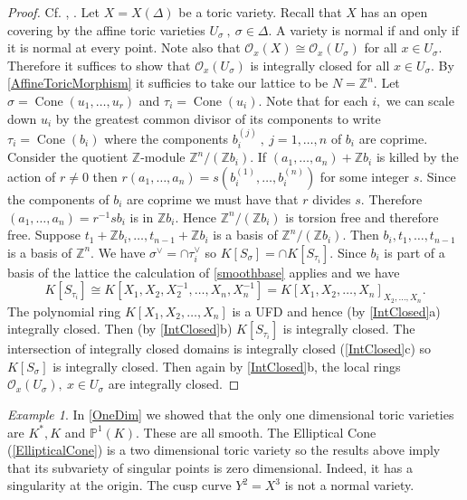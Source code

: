 \documentclass[BSc]{usydthesis}
\numberwithin{equation}{chapter}
\theoremstyle{remark}
\newtheorem{Example}[equation]{Example}
\newcommand{\Z}{\mathbb{Z}}
\newcommand{\Proj}{\mathbb{P}}
\newcommand{\V}{\vee}
\DeclareMathOperator{\Cone}{Cone}
\begin{document}
\begin{proof} Cf. \cite[Theorem 1.3.5]{Cox}, \cite[Page~ 29-30]{Fulton:Toric}. Let $X=X(\Delta)$ be a toric variety. Recall that $X$ has an open covering by the affine toric varieties $U_{\sigma} \ , \ \sigma \in \Delta.$ A variety is normal if and only if it is normal at every point. Note also that $\mathcal{O}_x(X) \cong \mathcal{O}_x(U_{\sigma})$ for all $x\in U_{\sigma}.$ Therefore it suffices to show that $\mathcal{O}_x(U_{\sigma})$ is integrally closed for all $x\in U_{\sigma}$. By \ref{AffineToricMorphism} it sufficies to take our lattice to be $N=\Z^n.$ Let $\sigma = \Cone(u_1, \ldots, u_r)$ and $\tau_i=\Cone(u_i).$ Note that for each $i,$ we can scale down $u_i$ by the greatest common divisor of its components to write $\tau_i = \Cone(b_i)$ where the components $b_i^{(j)} \ , \ j=1,\ldots, n$ of $b_i$ are coprime. Consider the quotient $\Z$-module $\Z^n/(\Z b_i).$ If $(a_1,\ldots, a_n)+\Z b_i$ is killed by the action of $r\neq 0$ then $r(a_1,\ldots, a_n) = s\left(b_i^{(1)}, \ldots, b_i^{(n)}\right)$ for some integer $s.$ Since the components of $b_i$ are coprime we must have that $r$ divides $s.$ Therefore $(a_1,\ldots, a_n) = r^{-1}s b_i$ is in $\Z b_i.$ Hence $\Z^n/(\Z b_i)$ is torsion free and therefore free. Suppose $t_1+ \Z b_i, \ldots, t_{n-1}+ \Z b_i$ is a basis of $\Z^n/(\Z b_i).$ Then $b_i, t_1, \ldots, t_{n-1}$ is a basis of $\Z^n.$ We have $\sigma^{\V} = \cap \tau_i^{\V}$ so $K[S_{\sigma}] = \cap K[S_{\tau_i}].$ Since $b_i$ is part of a basis of the lattice the calculation of \ref{smoothbase} applies and we have $$K[S_{\tau_i}] \cong K[X_1, X_2, X_2^{-1}, \ldots, X_n, X_n^{-1}]=K[X_1,X_2,\ldots,X_n]_{X_2,\ldots,X_n}.$$ The polynomial ring $K[X_1,X_2,\ldots, X_n]$ is a UFD and hence (by \ref{IntClosed}a) integrally closed. Then  (by \ref{IntClosed}b) $K[S_{\tau_i}]$ is integrally closed. The intersection of integrally closed domains is integrally closed (\ref{IntClosed}c) so $K[S_{\sigma}]$ is integrally closed. Then again by \ref{IntClosed}b, the local rings $\mathcal{O}_x(U_{\sigma}), \ x\in U_{\sigma}$ are integrally closed.
\end{proof}

\begin{Example}
 In \ref{OneDim} we showed that the only one dimensional toric varieties are $K^*, K$ and $\Proj^1(K).$ These are all smooth. The Elliptical Cone (\ref{EllipticalCone}) is a two dimensional toric variety so the results above imply that its subvariety of singular points is zero dimensional. Indeed, it has a singularity at the origin. The cusp curve $Y^2=X^3$ is not a normal variety. 
\end{Example}
\end{document}
